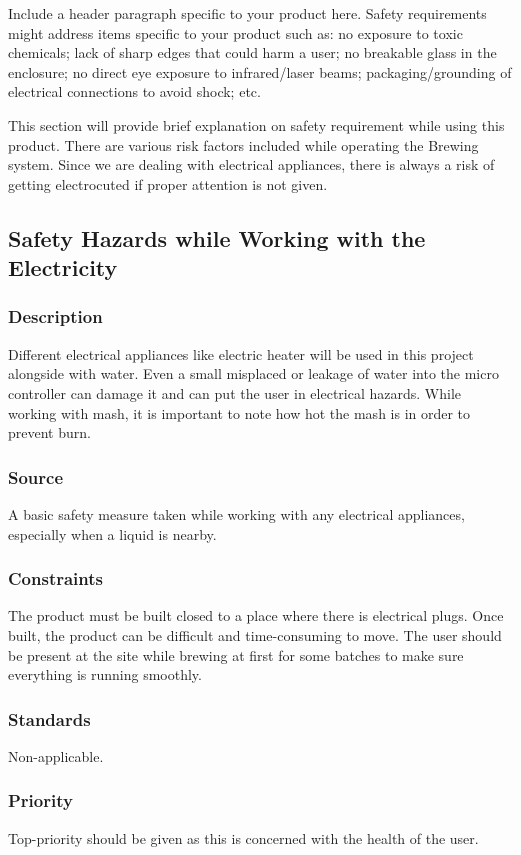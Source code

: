 Include a header paragraph specific to your product here. Safety requirements might address items specific to your product such as: no exposure to toxic chemicals; lack of sharp edges that could harm a user; no breakable glass in the enclosure; no direct eye exposure to infrared/laser beams; packaging/grounding of electrical connections to avoid shock; etc.

This section will provide brief explanation on safety requirement while using this product. There are various risk factors included while operating the Brewing system. Since we are dealing with electrical appliances, there is always a risk of getting electrocuted if proper attention is not given. 

\subsection{Safety Hazards while Working with the Electricity}
\subsubsection{Description}
Different electrical appliances like electric heater will be used in this project alongside with water. Even a small misplaced or leakage of water into the micro controller can damage it and can put the user in electrical hazards. While working with mash, it is important to note how hot the mash is in order to prevent burn.

\subsubsection{Source}
A basic safety measure taken while working with any electrical appliances, especially when a liquid is nearby.

\subsubsection{Constraints}
The product must be built closed to a place where there is electrical plugs. Once built, the product can be difficult and time-consuming to move. The user should be present at the site while brewing at first for some batches to make sure everything is running smoothly.

\subsubsection{Standards}
Non-applicable.

\subsubsection{Priority}
Top-priority should be given as this is concerned with the health of the user.